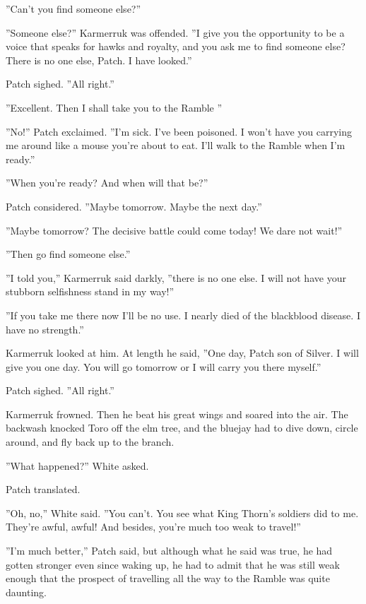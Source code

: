 \documentclass[11pt]{article}
\begin{document}
 ''Can't you find someone else?''\par
 ''Someone else?'' Karmerruk was offended. ''I give you the opportunity to be a voice that speaks for hawks and royalty, and you ask me to find someone else? There is no one else, Patch. I have looked.''\par
 Patch sighed. ''All right.''\par
 ''Excellent. Then I shall take you to the Ramble %
''\par
 ''No!'' Patch exclaimed. ''I'm sick. I've been poisoned. I won't have you carrying me around like a mouse you're about to eat. I'll walk to the Ramble when I'm ready.''\par
 ''When you're ready? And when will that be?''\par
 Patch considered. ''Maybe tomorrow. Maybe the next day.''\par
 ''Maybe tomorrow? The decisive battle could come today! We dare not wait!''\par
 ''Then go find someone else.''\par
 ''I told you,'' Karmerruk said darkly, ''there is no one else. I will not have your stubborn selfishness stand in my way!''\par
 ''If you take me there now I'll be no use. I nearly died of the blackblood disease. I have no strength.''\par
 Karmerruk looked at him. At length he said, ''One day, Patch son of Silver. I will give you one day. You will go tomorrow or I will carry you there myself.''\par
 Patch sighed. ''All right.''\par
 Karmerruk frowned. Then he beat his great wings and soared into the air. The backwash knocked Toro off the elm tree, and the bluejay had to dive down, circle around, and fly back up to the branch.\par
 ''What happened?'' White asked.\par
 Patch translated.\par
 ''Oh, no,'' White said. ''You can't. You see what King Thorn's soldiers did to me. They're awful, awful! And besides, you're much too weak to travel!''\par
 ''I'm much better,'' Patch said, but although what he said was true, he had gotten stronger even since waking up, he had to admit that he was still weak enough that the prospect of travelling all the way to the Ramble was quite daunting.\par
\par
\end{document}
